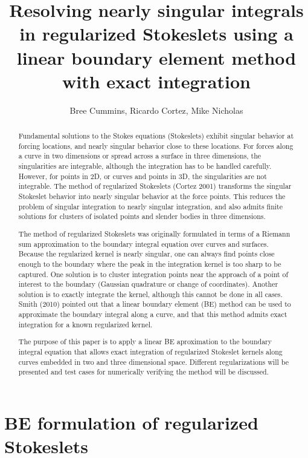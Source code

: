 \documentclass[12pt]{article}
\title{Resolving nearly singular integrals in regularized Stokeslets using a linear boundary element method with exact integration}
\author{Bree Cummins, Ricardo Cortez, Mike Nicholas}
\begin{document}
	
	\maketitle
	
	\begin{abstract}Fundamental solutions to the Stokes equations (Stokeslets) exhibit singular behavior at forcing locations, and nearly singular behavior close to these locations. For forces along a curve in two dimensions or spread across a surface in three dimensions, the singularities are integrable, although the integration has to be handled carefully. However, for points in 2D, or curves and points in 3D, the singularities are not integrable. The method of regularized Stokeslets (Cortez 2001) transforms the singular Stokeslet behavior into nearly singular behavior at the force points. This reduces the problem of singular integration to nearly singular integration, and also admits finite solutions for clusters of isolated points and slender bodies in three dimensions. 
	
	The method of regularized Stokeslets was originally formulated in terms of a Riemann sum approximation to the boundary integral equation over curves and surfaces. Because the regularized kernel is nearly singular, one can always find points close enough to the boundary where the peak in the integration kernel is too sharp to be captured. One solution is to cluster integration points near the approach of a point of interest to the boundary (Gaussian quadrature or change of coordinates). Another solution is to exactly integrate the kernel, although this cannot be done in all cases. Smith (2010) pointed out that a linear boundary element (BE) method can be used to approximate the boundary integral along a curve, and that this method admits exact integration for a known regularized kernel.
	
	The purpose of this paper is to apply a linear BE aproximation to the boundary integral equation that allows exact integration of regularized Stokeslet kernels along curves embedded in two and three dimensional space. Different regularizations will be presented and test cases for numerically verifying the method will be discussed.
\end{abstract}
	
	\section{BE formulation of regularized Stokeslets}
\end{document}
